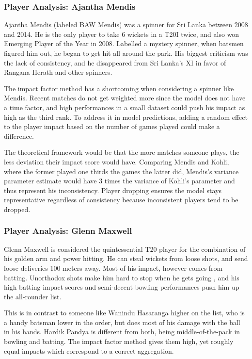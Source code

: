 \documentclass{article}[12pt]
\begin{document}
\subsubsection{Player Analysis: Ajantha Mendis}

Ajantha Mendis (labeled BAW Mendis) was a spinner for Sri Lanka between 2008 and 2014. He is the only player to take 6 wickets in a T20I twice, and also  won Emerging Player of the Year in 2008. Labelled a mystery spinner, when batsmen figured him out, he began to get hit all around the park. His biggest criticism was the lack of consistency, and he disappeared from Sri Lanka's XI in favor of Rangana Herath and other spinners. \parencite{cricbuzz_2025_ajantha}

The impact factor method has a shortcoming when considering a spinner like Mendis. Recent matches do not get weighted more since the model does not have a time factor, and high performances in a small dataset could push his impact as high as the third rank. To address it in model predictions, adding a random effect to the player impact based on the number of games played could make a difference. 

The theoretical framework would be that the more matches someone plays, the less deviation their impact score would have. Comparing Mendis and Kohli, where the former played one thirds the games the latter did, Mendis's variance parameter estimate would have 3 times the variance of Kohli's parameter and thus represent his inconsistency. Player dropping ensures the model stays representative regardless of consistency because inconsistent players tend to be dropped.

\subsubsection{Player Analysis: Glenn Maxwell}

Glenn Maxwell is considered the quintessential T20 player for the combination of his golden arm and power hitting. He can steal wickets from loose shots, and send loose deliveries 100 meters away. Most of his impact, however comes from batting. Unorthodox shots make him hard to stop when he gets going \parencite{espn_2023_afghanistan}, and his high batting impact scores and semi-decent bowling performances push him up the all-rounder list.

This is in contrast to someone like Wanindu Hasaranga higher on the list, who is a handy batsman lower in the order, but does most of his damage with the ball in his hands. Hardik Pandya is different from both, being middle-of-the-pack in bowling and batting. The impact factor method gives them high, yet roughly equal impacts which correspond to a correct aggregation.
\end{document}
